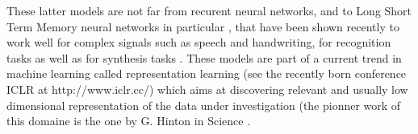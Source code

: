 These latter models are not far from recurent neural networks, and to Long Short Term Memory neural networks in particular \cite{DBLP:conf/nips/HochreiterS96, DBLP:journals/corr/GreffSKSS15}, that have been shown recently to work well for complex signals such as speech and handwriting, for recognition tasks \cite{DBLP:conf/nips/GravesS08} as well as for synthesis tasks \cite{DBLP:journals/corr/Graves13}. These models are part of a current trend in machine  learning called representation learning (see the recently born conference ICLR at http://www.iclr.cc/) which aims at discovering relevant and usually low dimensional representation of the data under investigation (the pionner work of this domaine is the one by G. Hinton in Science \cite{DBLP:journals/cogsci/HintonOWT06}.





% 


% 
% 




